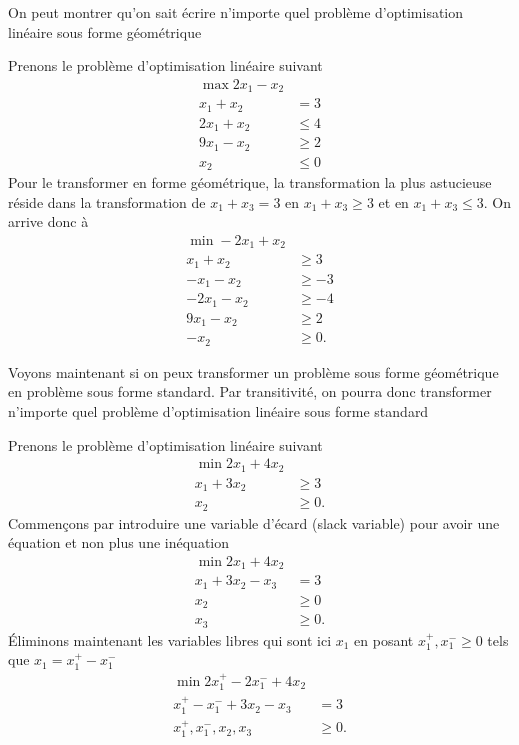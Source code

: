 On peut montrer qu'on sait écrire n'importe quel
problème d'optimisation linéaire sous forme géométrique
\begin{myexem}
  Prenons le problème d'optimisation linéaire suivant
  \begin{align*}
    \max 2x_1 - x_2\\
    x_1 + x_2 & = 3\\
    2x_1 + x_2 & \leq 4\\
    9x_1 - x_2 & \geq 2\\
    x_2 & \leq 0
  \end{align*}
  Pour le transformer en forme géométrique,
  la transformation la plus astucieuse réside dans la transformation
  de $x_1 + x_3 = 3$ en $x_1 + x_3 \geq 3$ et en $x_1 + x_3 \leq 3$.
  On arrive donc à
  \begin{align*}
    \min -2x_1 + x_2\\
    x_1 + x_2 & \geq 3\\
    -x_1 - x_2 & \geq -3\\
    -2x_1 - x_2 & \geq -4\\
    9x_1 - x_2 & \geq 2\\
    -x_2 & \geq 0.
  \end{align*}
\end{myexem}

Voyons maintenant si on peux transformer un problème sous forme géométrique
en problème sous forme standard.
Par transitivité, on pourra donc transformer n'importe quel
problème d'optimisation linéaire sous forme standard
\begin{myexem}
  Prenons le problème d'optimisation linéaire suivant
  \begin{align*}
    \min 2x_1 + 4x_2\\
    x_1 + 3x_2 & \geq 3\\
    x_2 & \geq 0.
  \end{align*}
  Commençons par introduire une variable d'écard (slack variable)
  pour avoir une équation et non plus une inéquation
  \begin{align*}
    \min 2x_1 + 4x_2\\
    x_1 + 3x_2 - x_3 & = 3\\
    x_2 & \geq 0\\
    x_3 & \geq 0.
  \end{align*}
  Éliminons maintenant les variables libres qui sont ici $x_1$ en
  posant $x_1^+, x_1^- \geq 0$ tels que $x_1 = x_1^+ - x_1^-$
  \begin{align*}
    \min 2x_1^+ - 2x_1^- + 4x_2\\
    x_1^+ - x_1^- + 3x_2 - x_3 & = 3\\
    x_1^+, x_1^-, x_2, x_3 & \geq 0.
  \end{align*}
\end{myexem}

